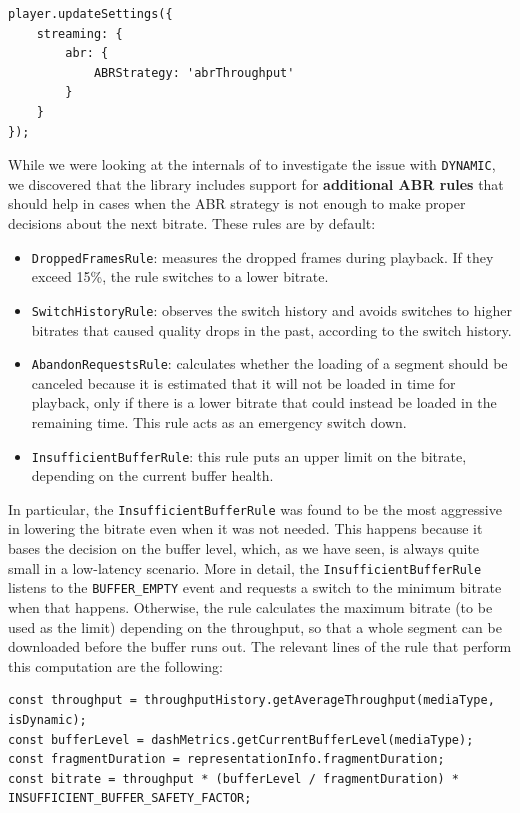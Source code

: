 \begin{verbatim}
player.updateSettings({
    streaming: {
        abr: {
            ABRStrategy: 'abrThroughput'
        }
    }
});
\end{verbatim}

While we were looking at the internals of \dashjs{} to investigate the issue with \texttt{DYNAMIC}, we discovered that the library includes support for \textbf{additional ABR rules} that should help in cases when the ABR strategy is not enough to make proper decisions about the next bitrate. These rules are by default:

\begin{itemize}
    \item \texttt{DroppedFramesRule}: measures the dropped frames during playback. If they exceed 15\%, the rule switches to a lower bitrate.
    \item \texttt{SwitchHistoryRule}: observes the switch history and avoids switches to higher bitrates that caused quality drops in the past, according to the switch history.
    \item \texttt{AbandonRequestsRule}: calculates whether the loading of a segment should be canceled because it is estimated that it will not be loaded in time for playback, only if there is a lower bitrate that could instead be loaded in the remaining time. This rule acts as an emergency switch down.
    \item \texttt{InsufficientBufferRule}: this rule puts an upper limit on the bitrate, depending on the current buffer health.
\end{itemize}

In particular, the \texttt{InsufficientBufferRule} was found to be the most aggressive in lowering the bitrate even when it was not needed. This happens because it bases the decision on the buffer level, which, as we have seen, is always quite small in a low-latency scenario. More in detail, the \texttt{InsufficientBufferRule} listens to the \texttt{BUFFER\_EMPTY} event and requests a switch to the minimum bitrate when that happens. Otherwise, the rule calculates the maximum bitrate (to be used as the limit) depending on the throughput, so that a whole segment can be downloaded before the buffer runs out. The relevant lines of the rule that perform this computation are the following:

\begin{verbatim}
const throughput = throughputHistory.getAverageThroughput(mediaType, isDynamic);
const bufferLevel = dashMetrics.getCurrentBufferLevel(mediaType);
const fragmentDuration = representationInfo.fragmentDuration;
const bitrate = throughput * (bufferLevel / fragmentDuration) * INSUFFICIENT_BUFFER_SAFETY_FACTOR;
\end{verbatim}

